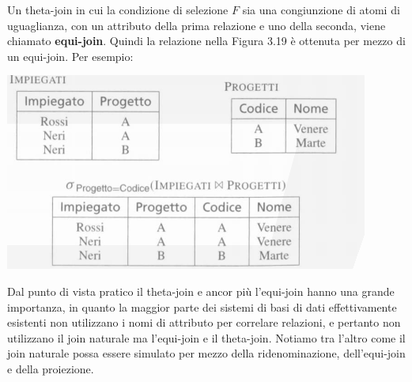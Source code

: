 \documentclass[a4paper,12pt, oneside]{book}
\begin{document}
\begin{itemize}
  Un theta-join in cui la condizione di selezione $F$ sia una congiunzione di atomi
di uguaglianza, con un attributo della prima relazione e uno della seconda, viene
chiamato\textbf{ equi-join}. Quindi la relazione nella Figura 3.19 è ottenuta per mezzo di
un equi-join. Per esempio:
  \begin{center}
  \includegraphics[scale=0.7]{img/alg17.png}
  \end{center}
  Dal punto di vista pratico il theta-join e ancor più l'equi-join hanno una grande
  importanza, in quanto la maggior parte dei sistemi di basi di dati effettivamente esistenti non utilizzano i nomi di attributo per correlare relazioni, e pertanto non
utilizzano il join naturale ma l'equi-join e il theta-join. Notiamo tra l'altro come il
join naturale possa essere simulato per mezzo della ridenominazione, dell'equi-join e della proiezione.
\end{itemize}
\end{document}
